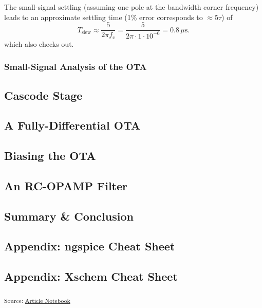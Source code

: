 \documentclass[
  a4paper,
  DIV=11,
  numbers=noendperiod]{scrartcl}
\begin{document}
The small-signal settling (assuming one pole at the bandwidth corner
frequency) leads to an approximate settling time (1\% error corresponds
to \(\approx 5 \tau\)) of \[
T_\mathrm{slew} \approx \frac{5}{2 \pi f_\mathrm{c}} = \frac{5}{2 \pi \cdot 1 \cdot 10^{-6}} = 0.8\,\mu\text{s}.
\] which also checks out.

\subsubsection{Small-Signal Analysis of the
OTA}\label{small-signal-analysis-of-the-ota}

\subsection{Cascode Stage}\label{cascode-stage}

\subsection{A Fully-Differential OTA}\label{a-fully-differential-ota}

\subsection{Biasing the OTA}\label{biasing-the-ota}

\subsection{An RC-OPAMP Filter}\label{an-rc-opamp-filter}

\subsection{Summary \& Conclusion}\label{summary-conclusion}

\subsection{Appendix: ngspice Cheat
Sheet}\label{appendix-ngspice-cheat-sheet}

\subsection{Appendix: Xschem Cheat
Sheet}\label{appendix-xschem-cheat-sheet}

\textsubscript{Source:
\href{https://iic-jku.github.io/analog-circuit-design/index.qmd.html}{Article
Notebook}}
\end{document}
